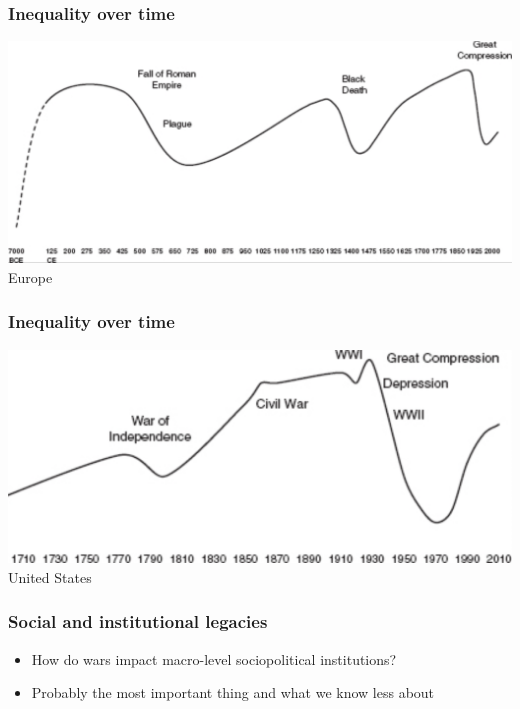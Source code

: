 \documentclass[aspectratio=43]{beamer}
\begin{document}
\begin{frame}
\frametitle{Inequality over time}
\centering

\includegraphics[width = \textwidth]{img/ineq-long-term-europe}\\\vspace{15pt}Europe

\end{frame}

\begin{frame}
\frametitle{Inequality over time}
\centering

\includegraphics[width = \textwidth]{img/ineq-us}\\\vspace{15pt}United States

\end{frame}

\begin{frame}
\frametitle{Social and institutional legacies}
\centering

\begin{itemize}
  \item How do wars impact macro-level sociopolitical institutions?
  \item Probably the most important thing and what we know less about
\end{itemize}

\end{frame}
\end{document}
